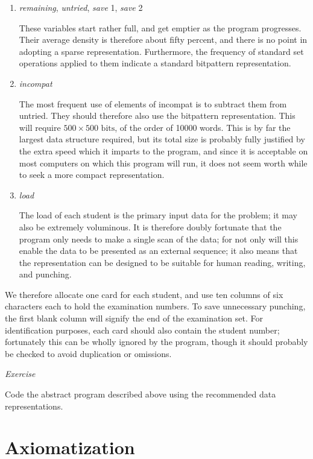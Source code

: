 \begin{enumerate}[wide, nosep, label=(\arabic*)]
	\item \textit{remaining}, \textit{untried}, \textit{save} 1, \textit{save} 2

	\noindent
	These variables start rather full, and get emptier as the program progresses. Their average density is therefore about fifty percent, and there is no point in adopting a sparse representation. Furthermore, the frequency of standard set operations applied to them indicate a standard bitpattern representation.

	\item \textit{incompat}

	\noindent
	The most frequent use of elements of incompat is to subtract them from untried. They should therefore also use the bitpattern representation. This will require $500 \times 500 \text{ bits}$, of the order of 10000 words. This is by far the largest data structure required, but its total size is probably fully justified by the extra speed which it imparts to the program, and since it is acceptable on most computers on which this program will run, it does not seem worth while to seek a more compact representation.

	\item \textit{load}

	\noindent
	The load of each student is the primary input data for the problem; it may also be extremely voluminous. It is therefore doubly fortunate that the program only needs to make a single scan of the data; for not only will this enable the data to be presented as an external sequence; it also means that the representation can be designed to be suitable for human reading, writing, and punching.

\end{enumerate}

We therefore allocate one card for each student, and use ten columns of six characters each to hold the examination numbers. To save unnecessary punching, the first blank column will signify the end of the examination set. For identification purposes, each card should also contain the student number; fortunately this can be wholly ignored by the program, though it should probably be checked to avoid duplication or omissions.

\noindent
\textit{Exercise}
\nopagebreak

\noindent
Code the abstract program described above using the recommended data representations.

\section{Axiomatization}

